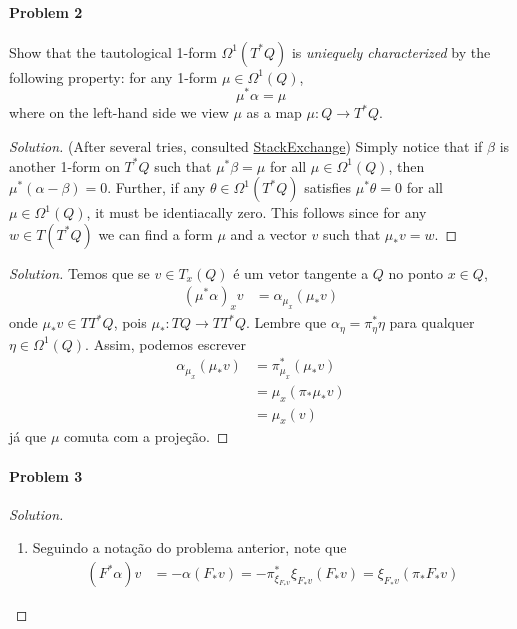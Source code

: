 \paragraph{Problem 2} Show that the tautological 1-form $\Omega^{1}(T^*Q)$ is \textit{uniequely characterized} by the following property: for any 1-form $\mu\in\Omega^{1}(Q)$,
\[\mu^*\alpha=\mu\]
where on the left-hand side we view  $\mu$ as a map $\mu:Q\to T^*Q$.

\begin{proof}[Solution]\leavevmode
	(After several tries, consulted \href{https://math.stackexchange.com/questions/4141107/a-characterization-of-the-tautological-form-liouville-1-form-on-the-cotangent}{StackExchange}) Simply notice that if $\beta$ is another 1-form on  $T^*Q$ such that $\mu^*\beta=\mu$ for all $\mu\in\Omega^{1}(Q)$, then  $\mu^*(\alpha-\beta)=0$. Further, if any  $\theta\in\Omega^{1}(T^*Q)$ satisfies $\mu^*\theta=0$ for all $\mu\in\Omega^{1}(Q)$, it must be identiacally zero. This follows since for any $w\in T(T^*Q)$ we can find a form $\mu$ and a vector $v$ such that $\mu_*v=w$.
\end{proof}


\begin{proof}[Solution]\leavevmode
	Temos que se $v\in T_x(Q)$ \'e um vetor tangente a $Q$ no ponto $x\in Q$,
	\begin{align*}
		(\mu^*\alpha)_xv&=\alpha_{\mu_x}(\mu_*v)
	\end{align*}
	onde $\mu_*v\in T T^*Q$, pois $\mu_*:TQ\to  T T^*Q$. Lembre que $\alpha_\eta=\pi^*_{\eta}\eta$ para qualquer $\eta\in\Omega^{1}(Q)$. Assim, podemos escrever
	\begin{align*}
		\alpha_{\mu_x}(\mu_*v)&=\pi_{\mu_x}^*(\mu_{*}v)\\
		& =\mu_x(\pi_{*}\mu_*v)\\
		&=\mu_x(v)
	\end{align*}
	j\'a que $\mu$ comuta com a proje\c c\~ao.
\end{proof}

\paragraph{Problem 3} 

\begin{proof}[Solution]\leavevmode
	\begin{enumerate}[label=\alph*.]
		\item Seguindo a nota\c c\~ao do problema anterior, note que
			\begin{align*}
			(F^*\alpha)v&=-\alpha(F_*v)=-\pi^*_{\xi_{F_*v}}\xi_{F_*v}(F_*v)=\xi_{F_*v}(\pi_*F_*v)
			\end{align*}
	\end{enumerate}
\end{proof}

